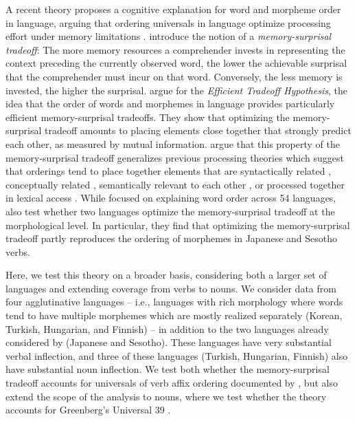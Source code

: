 \documentclass[man]{apa7}
\newcommand{\citep}{\parencite}
\newcommand{\citet}{\Textcite}
\newcommand\mhahn[1]{{\color{red}(#1)}}
\begin{document}
A recent theory proposes a cognitive explanation for word and morpheme order in language, arguing that ordering universals in language optimize processing effort under memory limitations \citep{Hahn2020modeling}.
\citet{Hahn2020modeling} introduce the notion of a \emph{memory-surprisal tradeoff}: The more memory resources a comprehender invests in representing the context preceding the currently observed word, the lower the achievable surprisal that the comprehender must incur on that word. Conversely, the less memory is invested, the higher the surprisal.
\citet{Hahn2020modeling} argue for the \emph{Efficient Tradeoff Hypothesis}, the idea that the order of words and morphemes in language provides particularly efficient memory-surprisal tradeoffs.
They show that optimizing the memory-surprisal tradeoff amounts to placing elements close together that strongly predict each other, as measured by mutual information.
\citet{Hahn2020modeling} argue that this property of the memory-surprisal tradeoff generalizes previous processing theories which suggest that orderings tend to place together elements that are syntactically related \citep{rijkhoff-word-1986, hawkins-performance-1994}, conceptually related \citep{givon1985iconicity}, semantically relevant to each other \citep{bybee-morphology-1985}, or processed together in lexical access \citep{hay2004what}.
While focused on explaining word order across 54 languages, \citet{Hahn2020modeling} also test whether two languages optimize the memory-surprisal tradeoff at the morphological level. In particular, they find that optimizing the memory-surprisal tradeoff partly reproduces the ordering of morphemes in Japanese and Sesotho verbs.




Here, we test this theory on a broader basis, considering both a larger set of languages and extending coverage from verbs to nouns.
We consider data from four agglutinative languages -- i.e., languages with rich morphology where words tend to have multiple morphemes which are mostly realized separately (Korean, Turkish, Hungarian, and Finnish) -- in addition to the two languages already considered by \citet{Hahn2020modeling} (Japanese and Sesotho).
These languages have very substantial verbal inflection, and three of these languages (Turkish, Hungarian, Finnish) also have substantial noun inflection. We test both whether the memory-surprisal tradeoff accounts for universals of verb affix ordering documented by \cite{bybee-morphology-1985}, but also extend the scope of the analysis to nouns, where we test whether the theory accounts for Greenberg's Universal 39 \citep{greenberg1963universals}. 
\end{document}
